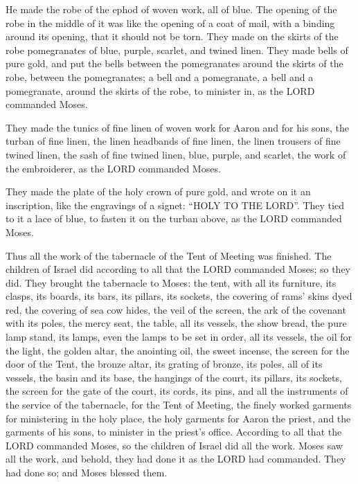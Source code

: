  He made the robe of the ephod of woven work, all of blue.
 The opening of the robe in the middle of it was like the
opening of a coat of mail, with a binding around its opening, that it
should not be torn.  They made on the skirts of the robe
pomegranates of blue, purple, scarlet, and twined linen. 
They made bells of pure gold, and put the bells between the pomegranates
around the skirts of the robe, between the pomegranates;  a
bell and a pomegranate, a bell and a pomegranate, around the skirts of
the robe, to minister in, as the LORD commanded Moses.

 They made the tunics of fine linen of woven work for Aaron
and for his sons,  the turban of fine linen, the linen
headbands of fine linen, the linen trousers of fine twined linen,
 the sash of fine twined linen, blue, purple, and scarlet,
the work of the embroiderer, as the LORD commanded Moses.

 They made the plate of the holy crown of pure gold, and
wrote on it an inscription, like the engravings of a signet: ``HOLY TO
THE LORD''.  They tied to it a lace of blue, to fasten it
on the turban above, as the LORD commanded Moses.

 Thus all the work of the tabernacle of the Tent of Meeting
was finished. The children of Israel did according to all that the LORD
commanded Moses; so they did.  They brought the tabernacle
to Moses: the tent, with all its furniture, its clasps, its boards, its
bars, its pillars, its sockets,  the covering of rams'
skins dyed red, the covering of sea cow hides, the veil of the screen,
 the ark of the covenant with its poles, the mercy seat,
 the table, all its vessels, the show bread, 
the pure lamp stand, its lamps, even the lamps to be set in order, all
its vessels, the oil for the light,  the golden altar, the
anointing oil, the sweet incense, the screen for the door of the Tent,
 the bronze altar, its grating of bronze, its poles, all of
its vessels, the basin and its base,  the hangings of the
court, its pillars, its sockets, the screen for the gate of the court,
its cords, its pins, and all the instruments of the service of the
tabernacle, for the Tent of Meeting,  the finely worked
garments for ministering in the holy place, the holy garments for Aaron
the priest, and the garments of his sons, to minister in the priest's
office.  According to all that the LORD commanded Moses, so
the children of Israel did all the work.  Moses saw all the
work, and behold, they had done it as the LORD had commanded. They had
done so; and Moses blessed them.

